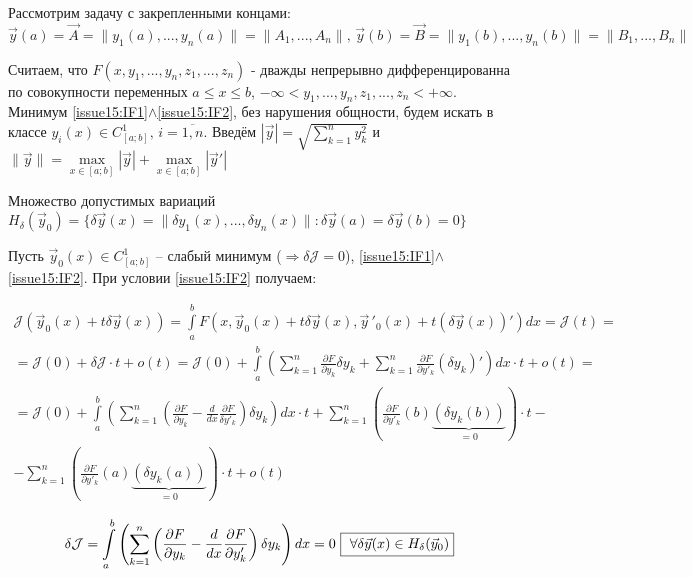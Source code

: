     Рассмотрим задачу с закрепленными концами: 
    \begin{equation} \label{issue15:IF2}
        \vec{y}(a) = \vec{A} = \| y_1(a), ..., y_n(a)\| = \| A_1, ..., A_n\|,\, \vec{y}(b) = \vec{B} = \| y_1(b), ..., y_n(b)\| = \| B_1, ..., B_n \|
    \end{equation}
    
    Считаем, что $F(x, y_1, ..., y_n, z_1, ..., z_n)$ - дважды непрерывно дифференцированна по совокупности переменных $a \leq x \leq b$, $-\infty < y_1, ..., y_n, z_1, ..., z_n < +\infty$. 
    Минимум \eqref{issue15:IF1}$\wedge$\eqref{issue15:IF2}, без нарушения общности, будем искать в классе $y_i(x) \in C^1_{[a;b]}, \, i = \overline{1, n}$. 
    Введём $|\vec{y}| = \sqrt{\sum \limits_{k=1}^{n} y^2_k}$ и $\|\vec{y}\| = \max \limits_{x \in [a;b]} |\vec{y}| + \max \limits_{x \in [a;b]} | \vec{y}' |$ 

    Множество допустимых вариаций $H_{\delta}(\vec{y}_0) = \{\delta \vec{y}(x) = \| \delta y_1 (x), ..., \delta y_n(x)\|: \delta \vec{y}(a) = \delta \vec{y}(b) = 0 \}$

    Пусть $\vec{y}_0(x) \in C^1_{[a;b]}$ -- слабый минимум ($\Rightarrow \delta \mathcal{J} = 0$), \eqref{issue15:IF1}$\wedge$\eqref{issue15:IF2}. При условии \eqref{issue15:IF2} получаем:
    
    \begin{multline*}
            \mathcal{J}(\vec{y}_0(x) + t \delta \vec{y}(x)) = \int \limits_a^b F(x, \vec{y}_0(x) + t\delta \vec{y}(x), \vec{y}\,'_0(x) + t(\delta \vec{y}(x))')dx = \mathcal{J}(t) = \\ 
            = \mathcal{J}(0) + \delta\mathcal{J}\cdot t + o(t) = \mathcal{J}(0) + \int \limits_a^b \left( \sum \limits_{k =1}^n \frac{\partial F}{\partial y_k} \delta y_k + \sum \limits_{k=1}^n \frac{\partial F}{\partial y'_k} (\delta y_k)' \right) dx \cdot t + o(t) = \\ 
            = \mathcal{J}(0) + \int \limits_a^b \left( \sum \limits_{k = 1}^n \left( \frac{\partial F}{\partial y_k} - \frac{d}{dx} \frac{\partial F}{\delta y'_k}  \right) \delta y_k \right) dx \cdot t
            + \sum \limits_{k = 1}^n \left( \frac{\partial F}{\partial y'_k}(b) \underbrace{(\delta y_k (b))}_{= 0} \right) \cdot t - \\ 
            - \sum \limits_{k = 1}^n \left( \frac{\partial F}{\partial y'_k}(a) \underbrace{(\delta y_k (a))}_{= 0} \right) \cdot t + o(t) 
    \end{multline*}

    \[ \delta \mathcal{J} = \int \limits_a^b \left(\sum \limits_{k = 1}^n \left( \frac{\partial F}{\partial y_k} - 
    \frac{d}{dx} \frac{\partial F}{\partial y'_k} \right) \delta y_k \right) dx = 0 \,\, 
    \text{\fbox{  $\forall \delta \vec{y}(x) \in H_{\delta}(\vec{y}_0) $}}
    \]

